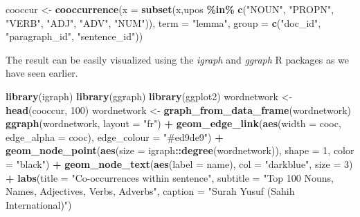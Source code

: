 \documentclass[
]{article}
\newenvironment{Shaded}{\begin{snugshade}}{\end{snugshade}}
\newcommand{\AttributeTok}[1]{\textcolor[rgb]{0.13,0.29,0.53}{#1}}
\newcommand{\DecValTok}[1]{\textcolor[rgb]{0.00,0.00,0.81}{#1}}
\newcommand{\FunctionTok}[1]{\textcolor[rgb]{0.13,0.29,0.53}{\textbf{#1}}}
\newcommand{\NormalTok}[1]{#1}
\newcommand{\OtherTok}[1]{\textcolor[rgb]{0.56,0.35,0.01}{#1}}
\newcommand{\SpecialCharTok}[1]{\textcolor[rgb]{0.81,0.36,0.00}{\textbf{#1}}}
\newcommand{\StringTok}[1]{\textcolor[rgb]{0.31,0.60,0.02}{#1}}
\begin{document}
\footnotesize

\begin{Shaded}
\begin{Highlighting}[]
\NormalTok{cooccur }\OtherTok{\textless{}{-}} \FunctionTok{cooccurrence}\NormalTok{(}\AttributeTok{x =} \FunctionTok{subset}\NormalTok{(x,upos }\SpecialCharTok{\%in\%} \FunctionTok{c}\NormalTok{(}\StringTok{"NOUN"}\NormalTok{, }\StringTok{"PROPN"}\NormalTok{, }\StringTok{"VERB"}\NormalTok{,}
                                                \StringTok{"ADJ"}\NormalTok{, }\StringTok{"ADV"}\NormalTok{, }\StringTok{"NUM"}\NormalTok{)), }
                        \AttributeTok{term =} \StringTok{"lemma"}\NormalTok{, }
                        \AttributeTok{group =} \FunctionTok{c}\NormalTok{(}\StringTok{"doc\_id"}\NormalTok{, }\StringTok{"paragraph\_id"}\NormalTok{, }\StringTok{"sentence\_id"}\NormalTok{))}
\end{Highlighting}
\end{Shaded}

\normalsize

The result can be easily visualized using the \emph{igraph} and \emph{ggraph} R packages as we have seen earlier.

\begin{Shaded}
\begin{Highlighting}[]
\FunctionTok{library}\NormalTok{(igraph)}
\FunctionTok{library}\NormalTok{(ggraph)}
\FunctionTok{library}\NormalTok{(ggplot2)}
\NormalTok{wordnetwork }\OtherTok{\textless{}{-}} \FunctionTok{head}\NormalTok{(cooccur, }\DecValTok{100}\NormalTok{)}
\NormalTok{wordnetwork }\OtherTok{\textless{}{-}} \FunctionTok{graph\_from\_data\_frame}\NormalTok{(wordnetwork)}
\FunctionTok{ggraph}\NormalTok{(wordnetwork, }\AttributeTok{layout =} \StringTok{"fr"}\NormalTok{) }\SpecialCharTok{+}
  \FunctionTok{geom\_edge\_link}\NormalTok{(}\FunctionTok{aes}\NormalTok{(}\AttributeTok{width =}\NormalTok{ cooc, }\AttributeTok{edge\_alpha =}\NormalTok{ cooc), }\AttributeTok{edge\_colour =} \StringTok{"\#ed9de9"}\NormalTok{) }\SpecialCharTok{+}
  \FunctionTok{geom\_node\_point}\NormalTok{(}\FunctionTok{aes}\NormalTok{(}\AttributeTok{size =}\NormalTok{ igraph}\SpecialCharTok{::}\FunctionTok{degree}\NormalTok{(wordnetwork)), }\AttributeTok{shape =} \DecValTok{1}\NormalTok{, }
                  \AttributeTok{color =} \StringTok{"black"}\NormalTok{) }\SpecialCharTok{+}
  \FunctionTok{geom\_node\_text}\NormalTok{(}\FunctionTok{aes}\NormalTok{(}\AttributeTok{label =}\NormalTok{ name), }\AttributeTok{col =} \StringTok{"darkblue"}\NormalTok{, }\AttributeTok{size =} \DecValTok{3}\NormalTok{) }\SpecialCharTok{+}
  \FunctionTok{labs}\NormalTok{(}\AttributeTok{title =} \StringTok{"Co{-}occurrences within sentence"}\NormalTok{,}
       \AttributeTok{subtitle =} \StringTok{"Top 100 Nouns, Names, Adjectives, Verbs, Adverbs"}\NormalTok{,}
       \AttributeTok{caption =} \StringTok{"Surah Yusuf (Sahih International)"}\NormalTok{)}
\end{Highlighting}
\end{Shaded}
\end{document}

